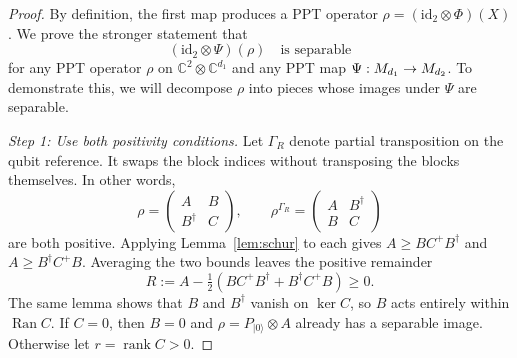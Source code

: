 \documentclass[aps,prl,reprint,superscriptaddress,longbibliography,raggedbottom]{revtex4-2}
\newcommand{\C}{\mathbb C}
\newcommand{\id}{\mathrm{id}}
\newcommand{\Ran}{\operatorname{Ran}}
\newcommand{\ket}[1]{\lvert #1\rangle}
\begin{document}
\begin{proof}
By definition, the first map produces a PPT operator
$\rho=(\id_2\otimes\Phi)(X)$. We prove the stronger statement that
\begin{equation}\label{eq:qubit}
(\id_2\otimes\Psi)(\rho)\quad\text{is separable}
\end{equation}
for any PPT operator $\rho$ on $\C^2\otimes\C^{d_1}$ and any PPT
map $\Psi:\nobreak M_{d_1}\to\nobreak M_{d_2}$. To demonstrate this, we will decompose $\rho$ into pieces
whose images under $\Psi$ are separable. 

\emph{Step 1: Use both positivity conditions.}
Let $\Gamma_R$ denote partial transposition on the qubit reference. It swaps
the block indices without transposing the blocks themselves. In other words, 
\begin{equation}\label{eq:rho}
\rho=\begin{pmatrix}A&B\\B^\dagger&C\end{pmatrix},\qquad
\rho^{\Gamma_R}=\begin{pmatrix}A&B^\dagger\\B&C\end{pmatrix}
\end{equation}
are both positive. Applying Lemma~\ref{lem:schur} to each gives
$A\ge BC^+B^\dagger$ and $A\ge B^\dagger C^+B$. Averaging the
two bounds leaves the positive remainder
\begin{equation}\label{eq:reserve}
R:=A-\tfrac12(BC^+B^\dagger+B^\dagger C^+B)\ge0.
\end{equation}
The same lemma shows that $B$ and $B^\dagger$ vanish on $\ker C$,
so $B$ acts entirely within $\Ran C$. If $C=0$, then $B=0$ and
$\rho=P_{\ket0}\otimes A$ already has a separable image. Otherwise
let $r=\operatorname{rank}C>0$.


\end{proof}
\end{document}
